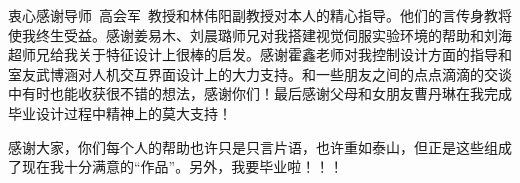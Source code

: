 \begin{acknowledgements}
衷心感谢导师~高会军~教授和林伟阳副教授对本人的精心指导。他们的言传身教将使我终生受益。感谢姜易木、刘晨璐师兄对我搭建视觉伺服实验环境的帮助和刘海超师兄给我关于特征设计上很棒的启发。感谢霍鑫老师对我控制设计方面的指导和室友武博涵对人机交互界面设计上的大力支持。和一些朋友之间的点点滴滴的交谈中有时也能收获很不错的想法，感谢你们！最后感谢父母和女朋友曹丹琳在我完成毕业设计过程中精神上的莫大支持！


感谢大家，你们每个人的帮助也许只是只言片语，也许重如泰山，但正是这些组成了现在我十分满意的“作品”。另外，我要毕业啦！！！

\end{acknowledgements}
